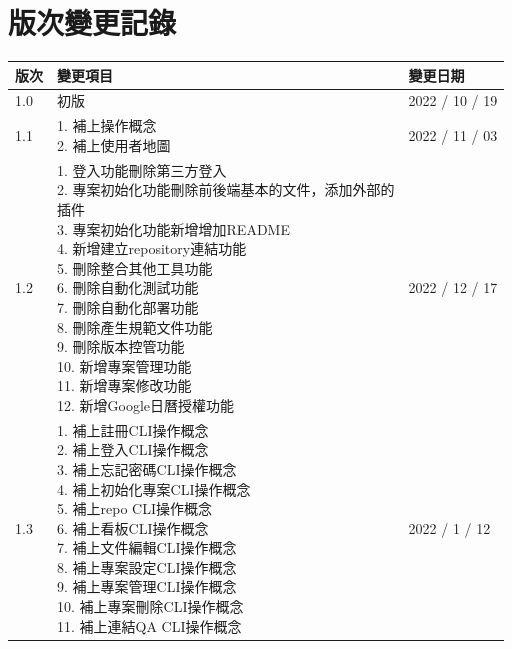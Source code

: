\documentclass{report}
\begin{document}
\section*{版次變更記錄}
\begin{tabularx}{\textwidth}{ 
  |p{}%
  |p{}%
  |p{}|%
}
  \hline
  版次 & 變更項目 & 變更日期 \\
  \hline
  1.0 & 初版 & 2022 / 10 / 19 \\
  \hline
  1.1 & 
  \makecell[l]{
    1. 補上操作概念 \\
    2. 補上使用者地圖 \\
  }
  & 2022 / 11 / 03 \\
  \hline
  1.2 & 
  \makecell[l]{
    1. 登入功能刪除第三方登入 \\
    2. 專案初始化功能刪除前後端基本的文件，添加外部的\\
    插件 \\
    3. 專案初始化功能新增增加README \\
    4. 新增建立repository連結功能 \\
    5. 刪除整合其他工具功能 \\
    6. 刪除自動化測試功能 \\
    7. 刪除自動化部署功能 \\
    8. 刪除產生規範文件功能 \\
    9. 刪除版本控管功能 \\ 
    10. 新增專案管理功能 \\
    11. 新增專案修改功能 \\
    12. 新增Google日曆授權功能 \\
  }
  & 2022 / 12 / 17 \\
  \hline
  1.3 & 
  \makecell[l]{
    1. 補上註冊CLI操作概念 \\
    2. 補上登入CLI操作概念\\
    3. 補上忘記密碼CLI操作概念\\
    4. 補上初始化專案CLI操作概念\\
    5. 補上repo CLI操作概念\\
    6. 補上看板CLI操作概念\\
    7. 補上文件編輯CLI操作概念\\
    8. 補上專案設定CLI操作概念\\
    9. 補上專案管理CLI操作概念 \\
    10. 補上專案刪除CLI操作概念 \\
    11. 補上連結QA CLI操作概念 \\
  }
  & 2022 / 1 / 12 \\
  \hline
\end{tabularx}
\end{document}
